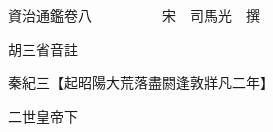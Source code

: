 










 


 
 


 

  
  
  
  
  





  
  
  
  
  
 
  

  

  
  
  



  

 
 

  
   




  

  
  


  　　資治通鑑卷八　　　　　宋　司馬光　撰

　　胡三省音註

　　秦紀三【起昭陽大荒落盡閼逢敦牂凡二年】

　　二世皇帝下

